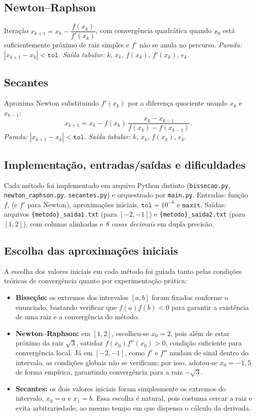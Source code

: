 \documentclass[12pt,a4paper]{article}
\begin{document}
\subsection{Newton--Raphson}
Iteração $x_{k+1}=x_k-\dfrac{f(x_k)}{f'(x_k)}$, com convergência quadrática quando $x_0$ está suficientemente próximo de raiz simples
e $f'$ não se anula no percurso. \emph{Parada:} $|x_{k+1}-x_k|<\texttt{tol}$.
\emph{Saída tabular:} $k$, $x_k$, $f(x_k)$, $f'(x_k)$, $e_k$.

\subsection{Secantes}
Aproxima Newton substituindo $f'(x_k)$ por a diferença quociente usando $x_{k}$ e $x_{k-1}$:
\[
x_{k+1}=x_k - f(x_k)\,\frac{x_k-x_{k-1}}{f(x_k)-f(x_{k-1})}.
\]
\emph{Parada:} $|x_{k+1}-x_k|<\texttt{tol}$.
\emph{Saída tabular:} $k$, $x_k$, $f(x_k)$, $e_k$.

\subsection{Implementação, entradas/saídas e dificuldades}
Cada método foi implementado em arquivo Python distinto (\texttt{bissecao.py}, \texttt{newton\_raphson.py}, \texttt{secantes.py})
e orquestrado por \texttt{main.py}. Entradas: função $f$, (e $f'$ para Newton), aproximações iniciais, $\texttt{tol}=10^{-6}$ e $\texttt{maxit}$.
Saídas: arquivos \texttt{\{metodo\}\_saida1.txt} (para $[-2,-1]$) e \texttt{\{metodo\}\_saida2.txt} (para $[1,2]$), com colunas alinhadas
e \emph{8 casas decimais} em dupla precisão.

\subsection{Escolha das aproximações iniciais}
A escolha dos valores iniciais em cada método foi guiada tanto pelas condições teóricas de convergência quanto por experimentação prática:

\begin{itemize}
    \item \textbf{Bisseção:} os extremos dos intervalos $[a,b]$ foram fixados conforme o enunciado, bastando verificar que $f(a)f(b)<0$ para garantir a existência de uma raiz e a convergência do método.

    \item \textbf{Newton--Raphson:} em $[1,2]$, escolheu-se $x_0=2$, pois além de estar próximo da raiz $\sqrt{3}$, satisfaz $f(x_0)f''(x_0)>0$, condição suficiente para convergência local. Já em $[-2,-1]$, como $f'$ e $f''$ mudam de sinal dentro do intervalo, as condições globais não se verificam; por isso, adotou-se $x_0=-1{,}5$ de forma empírica, garantindo convergência para a raiz $-\sqrt{3}$.

    \item \textbf{Secantes:} os dois valores iniciais foram simplesmente os extremos do intervalo, $x_0=a$ e $x_1=b$. Essa escolha é natural, pois costuma cercar a raiz e evita arbitrariedade, ao mesmo tempo em que dispensa o cálculo da derivada.
\end{itemize}
\end{document}
